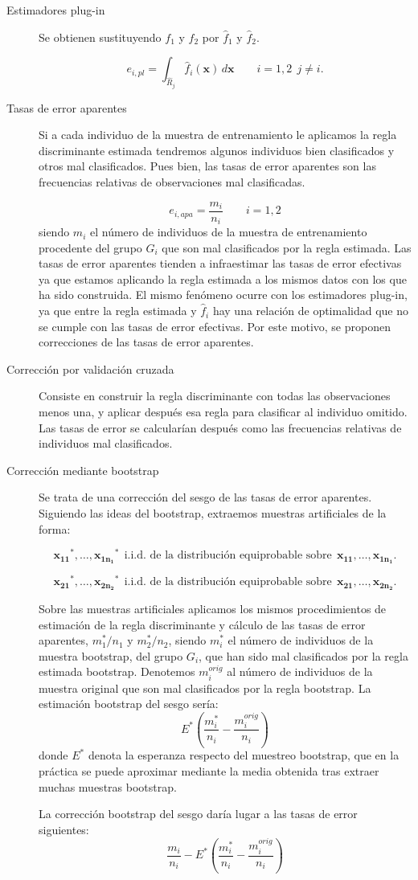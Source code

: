 \documentclass[
  a4paper,
  oneside]{scrbook}
\theoremstyle{definition}
\theoremstyle{definition}
\theoremstyle{definition}
\theoremstyle{definition}
\theoremstyle{remark}
\begin{document}
\begin{description}
\item[Estimadores plug-in]
Se obtienen sustituyendo \(f_1\) y \(f_2\) por \(\hat{f}_1\) y
\(\hat{f}_2\).

\[e_{i,pl}=\int_{\hat{R}_j}\hat{f}_i(\bm{x})\,d\bm{x}\qquad i=1,2\ \ j\neq i.\]
\item[Tasas de error aparentes]
Si a cada individuo de la muestra de entrenamiento le aplicamos la
regla discriminante estimada tendremos algunos individuos bien
clasificados y otros mal clasificados. Pues bien, las tasas de error
aparentes son las frecuencias relativas de observaciones mal
clasificadas.

\[e_{i,apa}=\frac{m_i}{n_i}\qquad i=1,2\] siendo \(m_i\) el número de individuos de la muestra de entrenamiento procedente
del grupo \(G_i\) que son mal clasificados por la regla estimada. Las
tasas de error aparentes tienden a infraestimar las tasas de error
efectivas ya que estamos aplicando la regla estimada a los mismos
datos con los que ha sido construida. El mismo fenómeno ocurre con
los estimadores plug-in, ya que entre la regla estimada y
\(\hat{f}_i\) hay una relación de optimalidad que no se cumple con las
tasas de error efectivas. Por este motivo, se proponen correcciones
de las tasas de error aparentes.
\item[Corrección por validación cruzada]
Consiste en construir la regla discriminante con todas las
observaciones menos una, y aplicar después esa regla para clasificar
al individuo omitido. Las tasas de error se calcularían después como
las frecuencias relativas de individuos mal clasificados.
\item[Corrección mediante bootstrap]
Se trata de una corrección del sesgo de las tasas de error
aparentes. Siguiendo las ideas del bootstrap, extraemos muestras
artificiales de la forma:

\[\bm{x_{11}}^*,\ldots,\bm{x_{1n_1}}^*\ \ \mbox{i.i.d. de la distribución equiprobable sobre}
\ \ \bm{x_{11}},\ldots,\bm{x_{1n_1}}.\]

\[\bm{x_{21}}^*,\ldots,\bm{x_{2n_2}}^*\ \ \mbox{i.i.d. de la distribución equiprobable sobre}
\ \ \bm{x_{21}},\ldots,\bm{x_{2n_2}}.\]

Sobre las muestras
artificiales aplicamos los mismos procedimientos de estimación de la
regla discriminante y cálculo de las tasas de error aparentes,
\(m_1^*/n_1\) y \(m_2^*/n_2\), siendo \(m_i^*\) el número de individuos de
la muestra bootstrap, del grupo \(G_i\), que han sido mal clasificados
por la regla estimada bootstrap. Denotemos \(m_i^{orig}\) al número de
individuos de la muestra original que son mal clasificados por la
regla bootstrap. La estimación bootstrap del sesgo sería:
\[E^*\left(\frac{m_i^*}{n_i}-\frac{m_i^{orig}}{n_i}\right)\] donde
\(E^*\) denota la esperanza respecto del muestreo bootstrap, que en la
práctica se puede aproximar mediante la media obtenida tras extraer
muchas muestras bootstrap.

La corrección bootstrap del sesgo daría lugar a las tasas de error
siguientes:
\[\frac{m_i}{n_i}-E^*\left(\frac{m_i^*}{n_i}-\frac{m_i^{orig}}{n_i}\right)\]
\end{description}
\end{document}
